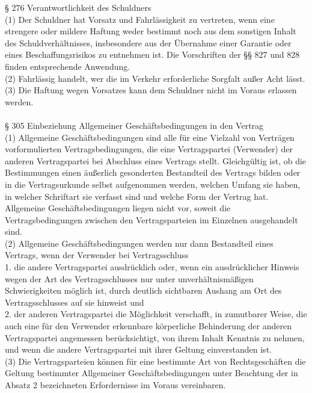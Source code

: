 \documentclass[12pt,titlepage]{report}
\begin{document}
§ 276 Verantwortlichkeit des Schuldners\\
(1) Der Schuldner hat Vorsatz und Fahrlässigkeit zu vertreten, wenn eine strengere oder mildere Haftung weder bestimmt noch aus dem sonstigen Inhalt des Schuldverhältnisses, insbesondere aus der Übernahme einer Garantie oder eines Beschaffungsrisikos zu entnehmen ist. Die Vorschriften der §§ 827 und 828 finden entsprechende Anwendung.\\
(2) Fahrlässig handelt, wer die im Verkehr erforderliche Sorgfalt außer Acht lässt.\\
(3) Die Haftung wegen Vorsatzes kann dem Schuldner nicht im Voraus erlassen werden.\\\\

§ 305 Einbeziehung Allgemeiner Geschäftsbedingungen in den Vertrag\\
(1) Allgemeine Geschäftsbedingungen sind alle für eine Vielzahl von Verträgen vorformulierten Vertragsbedingungen, die eine Vertragspartei (Verwender) der anderen Vertragspartei bei Abschluss eines Vertrags stellt. Gleichgültig ist, ob die Bestimmungen einen äußerlich gesonderten Bestandteil des Vertrags bilden oder in die Vertragsurkunde selbst aufgenommen werden, welchen Umfang sie haben, in welcher Schriftart sie verfasst sind und welche Form der Vertrag hat. Allgemeine Geschäftsbedingungen liegen nicht vor, soweit die Vertragsbedingungen zwischen den Vertragsparteien im Einzelnen ausgehandelt sind.\\
(2) Allgemeine Geschäftsbedingungen werden nur dann Bestandteil eines Vertrags, wenn der Verwender bei Vertragsschluss\\
1.
die andere Vertragspartei ausdrücklich oder, wenn ein ausdrücklicher Hinweis wegen der Art des Vertragsschlusses nur unter unverhältnismäßigen Schwierigkeiten möglich ist, durch deutlich sichtbaren Aushang am Ort des Vertragsschlusses auf sie hinweist und\\
2.
der anderen Vertragspartei die Möglichkeit verschafft, in zumutbarer Weise, die auch eine für den Verwender erkennbare körperliche Behinderung der anderen Vertragspartei angemessen berücksichtigt, von ihrem Inhalt Kenntnis zu nehmen,
und wenn die andere Vertragspartei mit ihrer Geltung einverstanden ist.\\
(3) Die Vertragsparteien können für eine bestimmte Art von Rechtsgeschäften die Geltung bestimmter Allgemeiner Geschäftsbedingungen unter Beachtung der in Absatz 2 bezeichneten Erfordernisse im Voraus vereinbaren.\\\\
\end{document}

